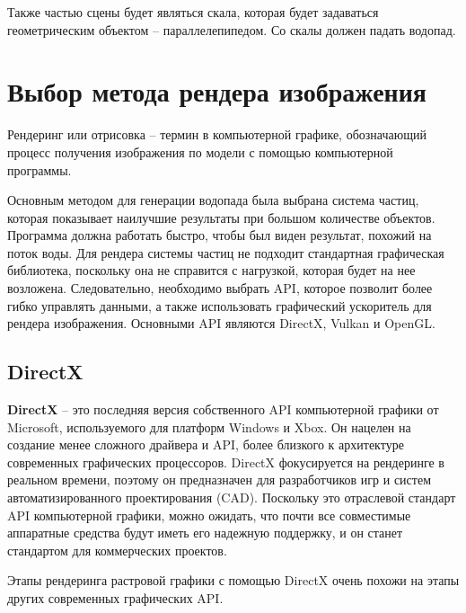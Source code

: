 Также частью сцены будет являться скала, которая будет задаваться геометрическим объектом -- параллелепипедом. Со скалы должен падать водопад.


\section{Выбор метода рендера изображения}

Рендеринг или отрисовка -- термин в компьютерной графике, обозначающий процесс получения изображения по модели с помощью компьютерной программы.

Основным методом для генерации водопада была выбрана система частиц, которая показывает наилучшие результаты при большом количестве объектов. Программа должна работать быстро, чтобы был виден результат, похожий на поток воды. Для рендера системы частиц не подходит стандартная графическая библиотека, поскольку она не справится с нагрузкой, которая будет на нее возложена. Следовательно, необходимо выбрать API, которое позволит более гибко управлять данными, а также использовать графический ускоритель для рендера изображения. Основными API являются DirectX, Vulkan и OpenGL.

\subsection{DirectX}

\textbf{DirectX} -- это последняя версия собственного API компьютерной графики от Microsoft, используемого для платформ Windows и Xbox. Он нацелен на создание менее сложного драйвера и API, более близкого к архитектуре современных графических процессоров. DirectX фокусируется на рендеринге в реальном времени, поэтому он предназначен для разработчиков игр и систем автоматизированного проектирования (CAD). Поскольку это отраслевой стандарт API компьютерной графики, можно ожидать, что почти все совместимые аппаратные средства будут иметь его надежную поддержку, и он станет стандартом для коммерческих проектов.

Этапы рендеринга растровой графики с помощью DirectX очень похожи на этапы других современных графических API. 

